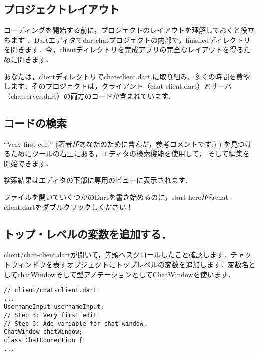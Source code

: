 \subsection{プロジェクトレイアウト}

コーディングを開始する前に，プロジェクトのレイアウトを理解しておくと役立ちます
．Dartエディタでdartchatプロジェクトの内部で，finishedディレクトリを開きます．今，clientディレクトリを完成アプリの完全なレイアウトを得るために開きます．


あなたは，clientディレクトリでchat-client.dart.に取り組み，多くの時間を費やします．そのプロジェクトは，クライアント（chat-client.dart）とサーバ（chatserver.dart）の両方のコードが含まれています．

\subsection{コードの検索}

``Very first edit'' (著者があなたのために含んだ，参考コメントです:) )
を見つけるためにツールの右上にある，エディタの検索機能を使用して，
そして編集を開始できます．


検索結果はエディタの下部に専用のビューに表示されます．


ファイルを開いていくつかのDartを書き始めるのに，start-hereからchat-client.dartをダブルクリックしください！


\subsection{トップ・レベルの変数を追加する．}

client/chat-client.dartが開いて，先頭へスクロールしたこと確認します．チャットウィンドウを表すオブジェクトにトップレベルの変数を追加します．変数名としてchatWindowそして型アノテーションとしてChatWindowを使います．

\begin{verbatim}
// client/chat-client.dart
...
UsernameInput usernameInput;
// Step 3: Very first edit
// Step 3: Add variable for chat window.
ChatWindow chatWindow;
class ChatConnection {
...
\end{verbatim}

